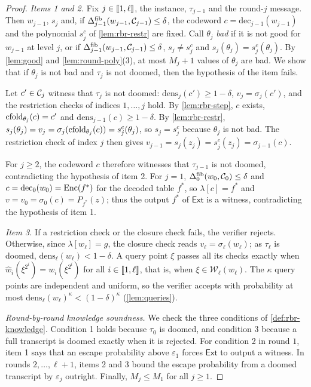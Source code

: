 \begin{proof}
\emph{Items 1 and 2.} Fix $j \in \llbracket 1, \ell \rrbracket$, the instance, $\tau_{j-1}$ and the round-$j$ message.
Then $w_{j-1}$, $s_j$ and, if $\Delta^{\mathrm{fib}}_{j-1}(w_{j-1},\mathcal{C}_{j-1}) \le \delta$, the codeword $c = \mathrm{dec}_{j-1}(w_{j-1})$ and the polynomial $s^{c}_j$ of \cref{lem:rbr-restr} are fixed.
Call $\theta_j$ \emph{bad} if it is not good for $w_{j-1}$ at level $j$, or if $\Delta^{\mathrm{fib}}_{j-1}(w_{j-1},\mathcal{C}_{j-1}) \le \delta$, $s_j \ne s^{c}_j$ and $s_j(\theta_j) = s^{c}_j(\theta_j)$.
By \cref{lem:good} and \cref{lem:round-poly}(3), at most $M_j + 1$ values of $\theta_j$ are bad.
We show that if $\theta_j$ is not bad and $\tau_j$ is not doomed, then the hypothesis of the item fails.

Let $c' \in \mathcal{C}_j$ witness that $\tau_j$ is not doomed: $\mathrm{dens}_j(c') \ge 1-\delta$, $v_j = \sigma_j(c')$, and the restriction checks of indices $1,\dots,j$ hold.
By \cref{lem:rbr-step}, $c$ exists, $\mathrm{cfold}_{\theta_j}(c) = c'$ and $\mathrm{dens}_{j-1}(c) \ge 1-\delta$.
By \cref{lem:rbr-restr}, $s_j(\theta_j) = v_j = \sigma_j(\mathrm{cfold}_{\theta_j}(c)) = s^{c}_j(\theta_j)$, so $s_j = s^{c}_j$ because $\theta_j$ is not bad.
The restriction check of index $j$ then gives $v_{j-1} = s_j(z_j) = s^{c}_j(z_j) = \sigma_{j-1}(c)$.

For $j \ge 2$, the codeword $c$ therefore witnesses that $\tau_{j-1}$ is not doomed, contradicting the hypothesis of item 2.
For $j = 1$, $\Delta^{\mathrm{fib}}_0(w_0,\mathcal{C}_0) \le \delta$ and $c = \mathrm{dec}_0(w_0) = \mathrm{Enc}(f^*)$ for the decoded table $f^*$, so $\lambda[c] = f^*$ and $v = v_0 = \sigma_0(c) = P_{f^*}(z)$; thus the output $f^*$ of $\mathsf{Ext}$ is a witness, contradicting the hypothesis of item 1.

\emph{Item 3.} If a restriction check or the closure check fails, the verifier rejects. Otherwise, since $\lambda[w_\ell] = g$, the closure check reads $v_\ell = \sigma_\ell(w_\ell)$; as $\tau_\ell$ is doomed, $\mathrm{dens}_\ell(w_\ell) < 1-\delta$.
A query point $\xi$ passes all its checks exactly when $\hat w_i(\xi^{2^i}) = w_i(\xi^{2^i})$ for all $i \in \llbracket 1, \ell \rrbracket$, that is, when $\xi \in \mathcal{W}_\ell(w_\ell)$.
The $\kappa$ query points are independent and uniform, so the verifier accepts with probability at most $\mathrm{dens}_\ell(w_\ell)^{\kappa} < (1-\delta)^{\kappa}$ (\cref{lem:queries}).

\emph{Round-by-round knowledge soundness.} We check the three conditions of \cref{def:rbr-knowledge}.
Condition 1 holds because $\tau_0$ is doomed, and condition 3 because a full transcript is doomed exactly when it is rejected.
For condition 2 in round $1$, item 1 says that an escape probability above $\varepsilon_1$ forces $\mathsf{Ext}$ to output a witness.
In rounds $2,\dots,\ell+1$, items 2 and 3 bound the escape probability from a doomed transcript by $\varepsilon_j$ outright.
Finally, $M_j \le M_1$ for all $j \ge 1$.
\end{proof}

